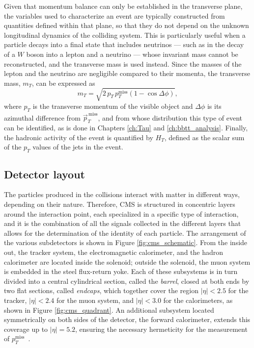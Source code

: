 Given that momentum balance can only be established in the transverse plane, the variables used to characterize an event are typically constructed from quantities defined within that plane, so that they do not depend on the unknown longitudinal dynamics of the colliding system. This is particularly useful when a particle decays into a final state that includes neutrinos — such as in the decay of a $W$ boson into a lepton and a neutrino — whose invariant mass cannot be reconstructed, and the transverse mass is used instead. Since the masses of the lepton and the neutrino are negligible compared to their momenta, the transverse mass, $m_T$, can be expressed as
\begin{equation}
    m_T = \sqrt{2\,p_T\,p_T^\text{miss}\left(1-\cos\Delta\phi\right)},
    \label{eq:mT}
\end{equation}
where $p_T$ is the transverse momentum of the visible object and $\Delta\phi$ is its azimuthal difference from $\vec{p}_T^{\,\text{miss}}$, and from whose distribution this type of event can be identified, as is done in Chapters \ref{ch:Tau} and \ref{ch:bbtt_analysis}. Finally, the hadronic activity of the event is quantified by $H_T$, defined as the scalar sum of the $p_T$ values of the jets in the event.





\subsection{Detector layout}
\label{subsec:CMS_detector}
%
The particles produced in the collisions interact with matter in different ways, depending on their nature. Therefore, CMS is structured in concentric layers around the interaction point, each specialized in a specific type of interaction, and it is the combination of all the signals collected in the different layers that allows for the determination of the identity of each particle. The arrangement of the various subdetectors is shown in Figure \ref{fig:cms_schematic}. From the inside out, the tracker system, the electromagnetic calorimeter, and the hadron calorimeter are located inside the solenoid; outside the solenoid, the muon system is embedded in the steel flux-return yoke. Each of these subsystems is in turn divided into a central cylindrical section, called the \textit{barrel}, closed at both ends by two flat sections, called \textit{endcaps}, which together cover the region $|\eta|<2.5$ for the tracker, $|\eta|<2.4$ for the muon system, and $|\eta|<3.0$ for the calorimeters, as shown in Figure \ref{fig:cms_quadrant}. An additional subsystem located symmetrically on both sides of the detector, the forward calorimeter, extends this coverage up to $|\eta|=5.2$, ensuring the necessary hermeticity for the measurement of $p_T^\text{miss}$~\cite{CMS:2008xjf,CMS:2023gfb}.

